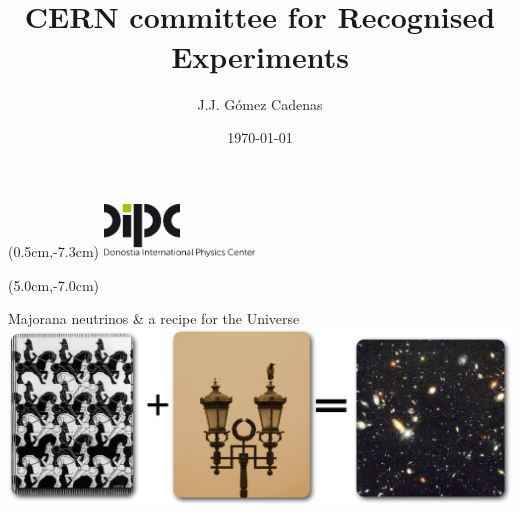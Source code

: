 \documentclass [aspectratio=169]{beamer}
\title[]{\vspace{60pt} \\
CERN committee for Recognised Experiments} %
\author[]{J.J. Gómez Cadenas}
\institute[]{Donostia International Physics Center}
\date{\today}
\begin{document}
{
\begin{frame}
    \titlepage
    \begin{textblock*}{4cm}(0.5cm,-7.3cm)
        \includegraphics[width=4cm]{dipc.png}
    \end{textblock*}
    \begin{textblock*}{8cm}(5.0cm,-7.0cm)
        \huge {} %
    \end{textblock*}
\end{frame}
}

%


\begin{frame}{Majorana neutrinos \& a recipe for the Universe}
\includegraphics[scale=0.40]{Universe.png}
\end{frame}




%
%
\end{document}
